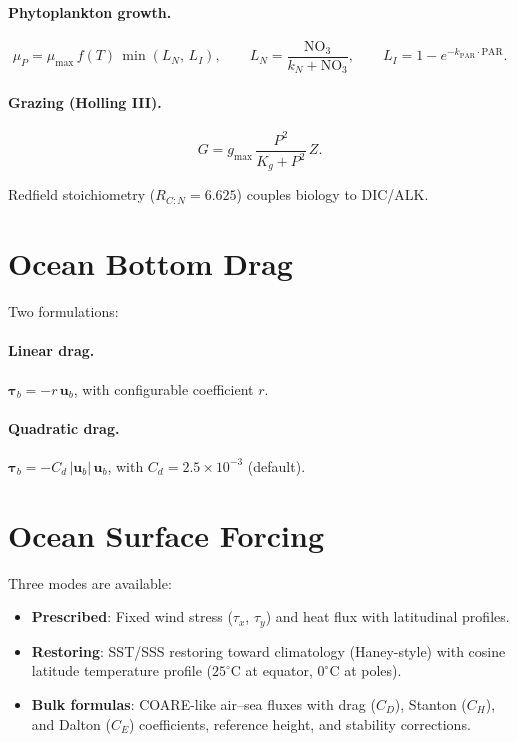 \documentclass[11pt,twoside]{report}
\newcommand{\vect}[1]{\bm{#1}}
\begin{document}
\paragraph{Phytoplankton growth.}
\begin{equation}
  \mu_P = \mu_{\max}\,f(T)\,\min(L_N,\,L_I),
  \qquad L_N = \frac{\mathrm{NO}_3}{k_N+\mathrm{NO}_3},
  \qquad L_I = 1-e^{-k_{\mathrm{PAR}}\cdot\mathrm{PAR}}.
\end{equation}

\paragraph{Grazing (Holling III).}
\begin{equation}
  G = g_{\max}\,\frac{P^2}{K_g+P^2}\,Z.
\end{equation}

Redfield stoichiometry ($R_{C:N}=6.625$) couples biology to DIC/ALK.


\section{Ocean Bottom Drag}

Two formulations:

\paragraph{Linear drag.}
$\vect{\tau}_b = -r\,\vect{u}_b$, with configurable coefficient $r$.

\paragraph{Quadratic drag.}
$\vect{\tau}_b = -C_d\,|\vect{u}_b|\,\vect{u}_b$, with $C_d = 2.5\times10^{-3}$ (default).

\section{Ocean Surface Forcing}

Three modes are available:
\begin{itemize}[nosep]
  \item \textbf{Prescribed}: Fixed wind stress ($\tau_x$, $\tau_y$) and heat flux with latitudinal profiles.
  \item \textbf{Restoring}: SST/SSS restoring toward climatology (Haney-style) with cosine latitude temperature profile ($25^\circ$C at equator, $0^\circ$C at poles).
  \item \textbf{Bulk formulas}: COARE-like air--sea fluxes with drag ($C_D$), Stanton ($C_H$), and Dalton ($C_E$) coefficients, reference height, and stability corrections.
\end{itemize}
\end{document}
